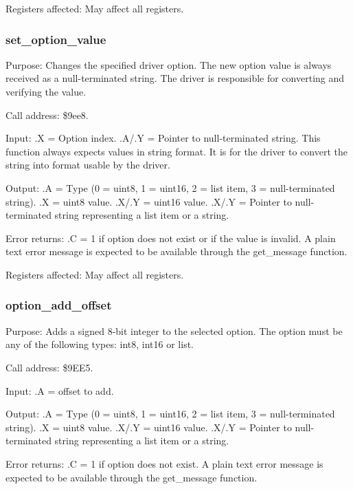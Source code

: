 \documentclass{article}
\begin{document}
            Registers affected: May affect all registers.

        \subsubsection{set\_option\_value}
            Purpose: Changes the specified driver option. The new option value
            is always received as a null-terminated string. The driver is
            responsible for converting and verifying the value.

            Call address: \$9ee8.

            Input: .X = Option index. .A/.Y = Pointer to null-terminated string. This
            function always expects values in string format. It is for the driver
            to convert the string into format usable by the driver.

            Output: .A = Type (0 = uint8, 1 = uint16, 2 = list item, 3 = null-terminated string). 
            .X = uint8 value.
            .X/.Y = uint16 value.
            .X/.Y = Pointer to null-terminated string representing a list item or a string. 

            Error returns: .C = 1 if option does not exist or if the value is
            invalid. A plain text error message is expected to be available through the
            get\_message function.

            Registers affected: May affect all registers.

        \subsubsection{option\_add\_offset}
            Purpose: Adds a signed 8-bit integer to the selected option. The option
            must be any of the following types: int8, int16 or list.
            
            Call address: \$9EE5.

            Input: .A = offset to add.

            Output: .A = Type (0 = uint8, 1 = uint16, 2 = list item, 3 = null-terminated string). 
            .X = uint8 value.
            .X/.Y = uint16 value.
            .X/.Y = Pointer to null-terminated string representing a list item or a string. 

            Error returns: .C = 1 if option does not exist. A plain text error message is expected 
            to be available through the get\_message function.
\end{document}
